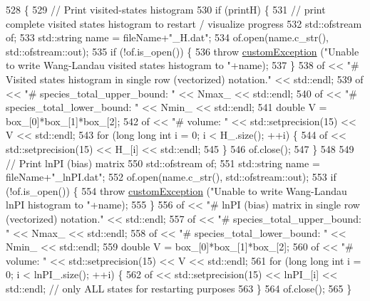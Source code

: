 \begin{DoxyCode}
528                                                        \{
529     \textcolor{comment}{// Print visited-states histogram}
530     \textcolor{keywordflow}{if} (printH) \{
531         \textcolor{comment}{// print complete visited states histogram to restart / visualize progress}
532         std::ofstream of;
533         std::string name = fileName+\textcolor{stringliteral}{"\_H.dat"};
534         of.open(name.c\_str(), std::ofstream::out);
535         \textcolor{keywordflow}{if} (!of.is\_open()) \{
536             \textcolor{keywordflow}{throw} \hyperlink{classcustom_exception}{customException} (\textcolor{stringliteral}{"Unable to write Wang-Landau visited states histogram to 
      "}+name);
537         \}
538         of << \textcolor{stringliteral}{"# Visited states histogram in single row (vectorized) notation."} << std::endl;
539         of << \textcolor{stringliteral}{"# species\_total\_upper\_bound: "} << Nmax\_ << std::endl;
540         of << \textcolor{stringliteral}{"# species\_total\_lower\_bound: "} << Nmin\_ << std::endl;
541         \textcolor{keywordtype}{double} V = box\_[0]*box\_[1]*box\_[2];
542         of << \textcolor{stringliteral}{"# volume: "} << std::setprecision(15) << V << std::endl;
543         \textcolor{keywordflow}{for} (\textcolor{keywordtype}{long} \textcolor{keywordtype}{long} \textcolor{keywordtype}{int} i = 0; i < H\_.size(); ++i) \{
544             of << std::setprecision(15) << H\_[i] << std::endl;
545         \}
546         of.close();
547     \}
548 
549     \textcolor{comment}{// Print lnPI (bias) matrix}
550     std::ofstream of;
551     std::string name = fileName+\textcolor{stringliteral}{"\_lnPI.dat"};
552     of.open(name.c\_str(), std::ofstream::out);
553     \textcolor{keywordflow}{if} (!of.is\_open()) \{
554         \textcolor{keywordflow}{throw} \hyperlink{classcustom_exception}{customException} (\textcolor{stringliteral}{"Unable to write Wang-Landau lnPI histogram to "}+name);
555     \}
556     of << \textcolor{stringliteral}{"# lnPI (bias) matrix in single row (vectorized) notation."} << std::endl;
557     of << \textcolor{stringliteral}{"# species\_total\_upper\_bound: "} << Nmax\_ << std::endl;
558     of << \textcolor{stringliteral}{"# species\_total\_lower\_bound: "} << Nmin\_ << std::endl;
559     \textcolor{keywordtype}{double} V = box\_[0]*box\_[1]*box\_[2];
560     of << \textcolor{stringliteral}{"# volume: "} << std::setprecision(15) << V << std::endl;
561     \textcolor{keywordflow}{for} (\textcolor{keywordtype}{long} \textcolor{keywordtype}{long} \textcolor{keywordtype}{int} i = 0; i < lnPI\_.size(); ++i) \{
562         of << std::setprecision(15) << lnPI\_[i] << std::endl; \textcolor{comment}{// only ALL states for restarting purposes}
563     \}
564     of.close();
565 \}
\end{DoxyCode}
